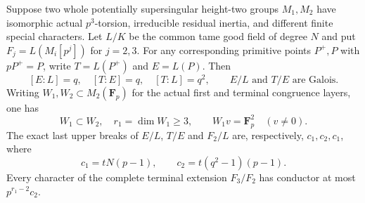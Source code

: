 \begin{lemma}
\label{lem:B-RD99-points}
Suppose two whole potentially supersingular height-two groups
$M_1,M_2$ have isomorphic actual $p^3$-torsion, irreducible
residual inertia, and different finite special characters.
Let $L/K$ be the common tame good field of degree $N$ and put
$F_j=L(M_i[p^j])$ for $j=2,3$. For any corresponding primitive
points $P^+,P$ with $pP^+=P$, write $T=L(P^+)$ and $E=L(P)$.
Then
\[
 [E:L]=q,\quad[T:E]=q,\quad[T:L]=q^2,\qquad
 E/L\text{ and }T/E\text{ are Galois}.                 \tag{B-RD99.2}
\]
Writing $W_1,W_2\subset M_2(\mathbf F_p)$ for the actual
first and terminal congruence layers, one has
\[
 W_1\subset W_2,\quad r_1=\dim W_1\ge3,
 \qquad W_1v=\mathbf F_p^2\quad(v\ne0).               \tag{B-RD99.3}
\]
The exact last upper breaks of $E/L$, $T/E$ and $F_2/L$ are,
respectively, $c_1,c_2,c_1$, where
\[
 c_1=tN(p-1),\qquad c_2=t(q^2-1)(p-1).
                                                        \tag{B-RD99.4}
\]
Every character of the complete terminal extension $F_3/F_2$
has conductor at most $p^{r_1-2}c_2$.
\end{lemma}
